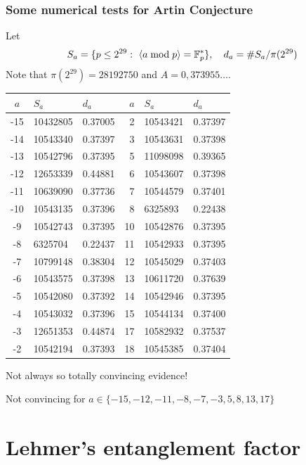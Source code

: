 \documentclass[10pt,handout]{beamer} %
\begin{document}
\begin{frame}
\frametitle{Some numerical tests for Artin Conjecture}

Let $$S_a=\{p\le 2^{29}:\ \langle a\bmod p\rangle=\mathbb F_p^*\},\quad d_a=\#S_a/\pi(2^{29})$$ 
Note that $\pi(2^{29})=28192750$ and $A=0,373955\ldots$.  \pause

\begin{center}
\begin{scriptsize}
\begin{tabular}{|c|l|l||r|l|l|}
\hline
$a$ & $S_a$ & $d_a$ & $a$& $S_a$ & $d_a$\\
\hline
-15& 10432805 &0.37005& 2& 10543421& 0.37397\\
-14& 10543340 &0.37397& 3& 10543631& 0.37398  \\
-13& 10542796 &0.37395& 5& 11098098& 0.39365    \\
-12& 12653339 &0.44881& 6& 10543607& 0.37398      \\
-11& 10639090 &0.37736& 7& 10544579& 0.37401        \\
-10& 10543135 &0.37396& 8& 6325893 & 0.22438          \\
-9 &10542743  &0.37395&10& 10542876& 0.37395            \\
-8 &6325704   &0.22437&11& 10542933& 0.37395              \\
-7 &10799148  &0.38304&12& 10545029& 0.37403\\
-6 &10543575  &0.37398&13& 10611720& 0.37639  \\
-5 &10542080  &0.37392&14& 10542946& 0.37395    \\
-4 &10543032  &0.37396&15& 10544134& 0.37400      \\
-3 &12651353  &0.44874&17& 10582932& 0.37537 \\
-2 &10542194  &0.37393&18& 10545385& 0.37404 \\\hline
\end{tabular}\end{scriptsize}
\end{center}
 \pause

Not always so totally convincing evidence!\pause

\centerline{\alert{Not convincing for $a\in\{-15, -12, -11, -8, -7, -3, 5, 8, 13, 17\}$}}
\end{frame}

\section{Lehmer's entanglement factor}
\end{document}
